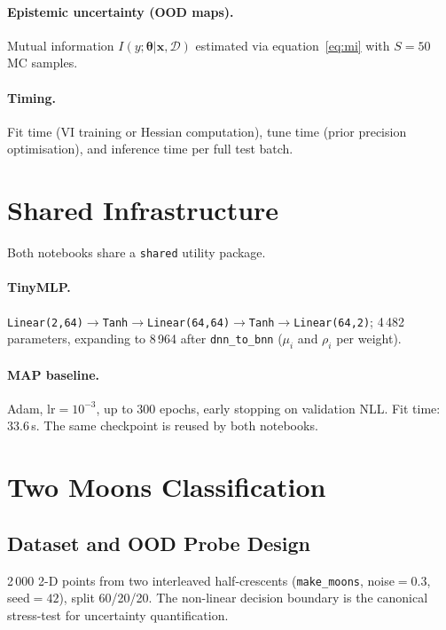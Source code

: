 \documentclass[12pt,a4paper]{article}
\newcommand{\btheta}{\bm{\theta}}
\newcommand{\cD}{\mathcal{D}}
\begin{document}
\paragraph{Epistemic uncertainty (OOD maps).}
Mutual information $I(y;\btheta|\bm{x},\cD)$ estimated via
equation~\eqref{eq:mi} with $S=50$ MC samples.

\paragraph{Timing.}
Fit time (VI training or Hessian computation), tune time (prior precision
optimisation), and inference time per full test batch.

\section{Shared Infrastructure}
\label{sec:shared}

Both notebooks share a \texttt{shared} utility package.

\paragraph{TinyMLP.}
\texttt{Linear(2,64)$\to$Tanh$\to$Linear(64,64)$\to$Tanh$\to$Linear(64,2)};
4\,482 parameters, expanding to 8\,964 after \texttt{dnn\_to\_bnn}
($\mu_i$ and $\rho_i$ per weight).

\paragraph{MAP baseline.}
Adam, lr$=10^{-3}$, up to 300 epochs, early stopping on validation NLL.
Fit time: $33.6$\,s. The same checkpoint is reused by both notebooks.

\section{Two Moons Classification}
\label{sec:twomoons}

\subsection{Dataset and OOD Probe Design}

2\,000 2-D points from two interleaved half-crescents
(\texttt{make\_moons}, noise$=0.3$, seed$=42$), split 60/20/20.
The non-linear decision boundary is the canonical stress-test for
uncertainty quantification.
\end{document}
